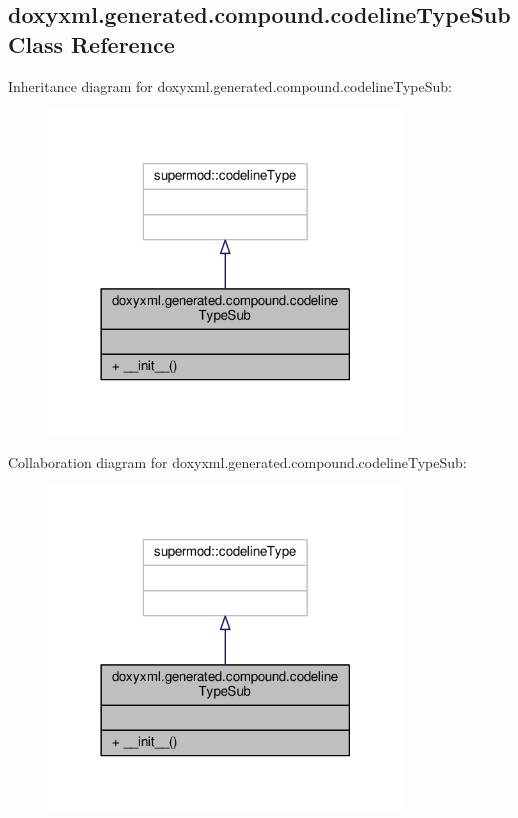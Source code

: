 \subsection{doxyxml.\+generated.\+compound.\+codeline\+Type\+Sub Class Reference}
\label{classdoxyxml_1_1generated_1_1compound_1_1codelineTypeSub}


Inheritance diagram for doxyxml.\+generated.\+compound.\+codeline\+Type\+Sub\+:
\nopagebreak
\begin{figure}[H]
\begin{center}
\leavevmode
\includegraphics[width=266pt]{dd/df7/classdoxyxml_1_1generated_1_1compound_1_1codelineTypeSub__inherit__graph}
\end{center}
\end{figure}


Collaboration diagram for doxyxml.\+generated.\+compound.\+codeline\+Type\+Sub\+:
\nopagebreak
\begin{figure}[H]
\begin{center}
\leavevmode
\includegraphics[width=266pt]{dc/db2/classdoxyxml_1_1generated_1_1compound_1_1codelineTypeSub__coll__graph}
\end{center}
\end{figure}
